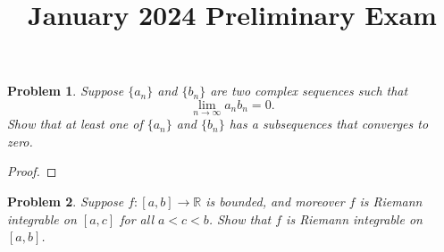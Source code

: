 \documentclass[11pt,twoside]{amsart}
\title{January 2024 Preliminary Exam}
\author{}
\theoremstyle{plain}
\newtheorem{prob}{Problem}
\newcommand{\RR}{\mathbb{R}}
\begin{document}
\maketitle

\begin{prob}
  Suppose $\{a_n\}$ and $\{b_n\}$ are two complex sequences such that 
  \begin{equation*}
    \lim_{n \to \infty}{a_n b_n} = 0.
  \end{equation*}
  Show that at least one of $\{a_n\}$ and $\{b_n\}$ has a subsequences that converges to zero.
\end{prob}
\begin{proof}
  
\end{proof}

\begin{prob}
  Suppose $f: [a,b] \to \RR$ is bounded, and moreover $f$ is Riemann integrable on $[a,c]$
  for all $a < c < b$. Show that $f$ is Riemann integrable on $[a,b]$. 
\end{prob}
    
\end{document}
